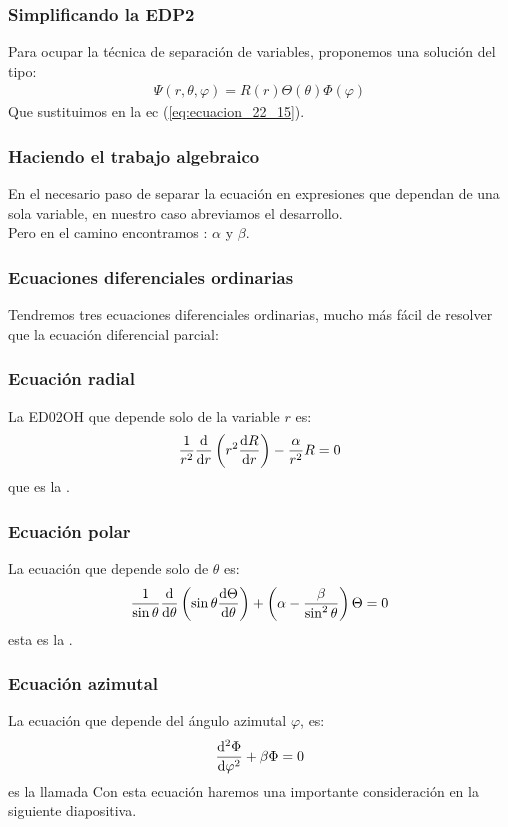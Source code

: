 \documentclass[12pt]{beamer}
\begin{document}
\begin{frame}
\frametitle{Simplificando la EDP2}
Para ocupar la técnica de separación de variables, proponemos una solución del tipo:
\pause
\begin{align*}
\Psi(r, \theta, \varphi) = R(r) \Theta (\theta) \Phi(\varphi)
\end{align*}
\pause
Que sustituimos en la ec (\ref{eq:ecuacion_22_15}).
\end{frame}
\begin{frame}
\frametitle{Haciendo el trabajo algebraico}
En el necesario paso de separar la ecuación en expresiones que dependan de una sola variable, en nuestro caso abreviamos el desarrollo.
\\
\bigskip
\pause
Pero en el camino encontramos : $\alpha$ y $\beta$.
\end{frame}
\begin{frame}
\frametitle{Ecuaciones diferenciales ordinarias}
Tendremos tres ecuaciones diferenciales ordinarias, mucho más fácil de resolver que la ecuación diferencial parcial:
\end{frame}
\begin{frame}
\frametitle{Ecuación radial}
La ED02OH que depende solo de la variable $r$ es:
\pause
\begin{align}
\dfrac{1}{r^{2}} \dv{r} \left( r^{2} \dv{R}{r} \right) - \dfrac{\alpha}{r^{2}} R = 0
\label{eq:ecuacion_26_1a}
\end{align}
que es la .
\end{frame}
\begin{frame}
\frametitle{Ecuación polar}
La ecuación que depende solo de $\theta$ es:
\pause
\begin{align}
\dfrac{1}{\sin \theta} \dv{\theta} \left( \sin \theta \dv{\Theta}{\theta} \right) + \left( \alpha - \dfrac{\beta}{\sin^{2} \theta} \right) \Theta = 0
\label{eq:ecuacion_26_1b}
\end{align}
esta es la .
\end{frame}
\begin{frame}
\frametitle{Ecuación azimutal}
La ecuación que depende del ángulo azimutal $\varphi$, es:
\begin{align}
\dv[2]{\Phi}{\varphi} + \beta \Phi = 0
\label{eq:ecuacion_26_1c}
\end{align}
es la llamada 
\pause
Con esta ecuación haremos una importante consideración en la siguiente diapositiva.
\end{frame}
\end{document}
